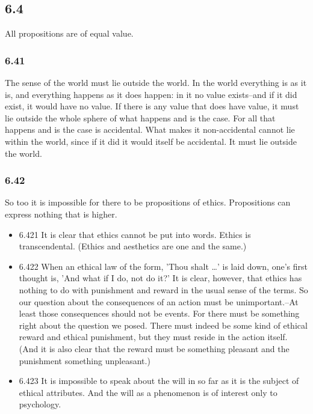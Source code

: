 \documentclass[11pt]{article}
\begin{document}
\subsection*{6.4}
\label{sec:orge508478}
All propositions are of equal value.
\subsubsection*{6.41}
\label{sec:orgadb2f4f}
The sense of the world must lie outside the world. In the world
everything is as it is, and everything happens as it does happen: in it no
value exists--and if it did exist, it would have no value. If there is any
value that does have value, it must lie outside the whole sphere of what
happens and is the case. For all that happens and is the case is
accidental. What makes it non-accidental cannot lie within the world, since
if it did it would itself be accidental. It must lie outside the world.
\subsubsection*{6.42}
\label{sec:org082bdd6}
So too it is impossible for there to be propositions of ethics.
Propositions can express nothing that is higher.
\begin{itemize}
\item 6.421
\label{sec:orgef0ed57}
It is clear that ethics cannot be put into words. Ethics is
transcendental. (Ethics and aesthetics are one and the same.)
\item 6.422
\label{sec:org5f802c6}
When an ethical law of the form, 'Thou shalt \ldots{}' is laid down, one's
first thought is, 'And what if I do, not do it?' It is clear, however, that
ethics has nothing to do with punishment and reward in the usual sense of
the terms. So our question about the consequences of an action must be
unimportant.--At least those consequences should not be events. For there
must be something right about the question we posed. There must indeed be
some kind of ethical reward and ethical punishment, but they must reside in
the action itself. (And it is also clear that the reward must be something
pleasant and the punishment something unpleasant.)
\item 6.423
\label{sec:orgd9888a5}
It is impossible to speak about the will in so far as it is the
subject of ethical attributes. And the will as a phenomenon is of interest
only to psychology.
\end{itemize}
\end{document}
